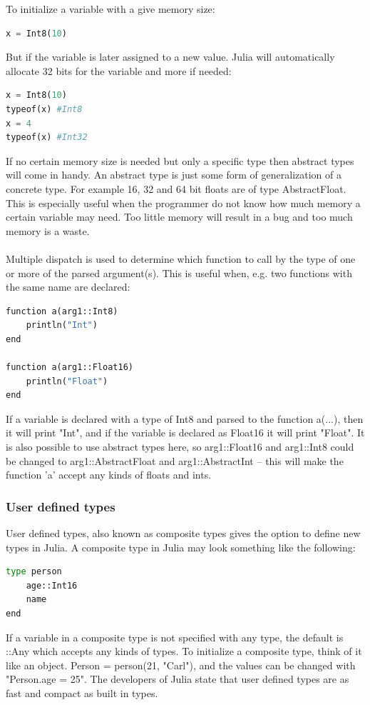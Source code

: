 \documentclass[a4paper,11pt]{article}
\begin{document}
To initialize a variable with a give memory size:
\begin{lstlisting}[language=python]
x = Int8(10)
\end{lstlisting}
But if the variable is later assigned to a new value. Julia will automatically allocate 32 bits for the variable and more if needed:
\begin{lstlisting}[language=python]
x = Int8(10)
typeof(x) #Int8
x = 4
typeof(x) #Int32
\end{lstlisting}
If no certain memory size is needed but only a specific type then abstract types will come in handy. An abstract type is just some form of generalization of a concrete type. For example 16, 32 and 64 bit floats are of type AbstractFloat. This is especially useful when the programmer do not know how much memory a certain variable may need. Too little memory will result in a bug and too much memory is a waste. 
\\
\\
Multiple dispatch is used to determine which function to call by the type of one or more of the parsed argument(s). This is useful when, e.g. two functions with the same name are declared:

\begin{lstlisting}[language=python]
function a(arg1::Int8)
	println("Int")  
end

function a(arg1::Float16)  
	println("Float")  
end    
\end{lstlisting}
If a variable is declared with a type of Int8 and parsed to the function a(...), then it will print "Int", and if the variable is declared as Float16 it will print "Float". It is also possible to use abstract types here, so arg1::Float16 and arg1::Int8 could be changed to arg1::AbstractFloat and arg1::AbstractInt – this will make the function 'a' accept any kinds of floats and ints.  
\subsubsection{User defined types}
User defined types, also known as composite types gives the option to define new types in Julia. A composite type in Julia may look something like the following: 
\begin{lstlisting}[language=python]
type person 
	age::Int16 
	name 
end    
\end{lstlisting}
If a variable in a composite type is not specified with any type, the default is ::Any which accepts any kinds of types. To initialize a composite type, think of it like an object. Person = person(21, "Carl"), and the values can be changed with "Person.age = 25". The developers of Julia state that user defined types are as fast and compact as built in types. 
\end{document}

